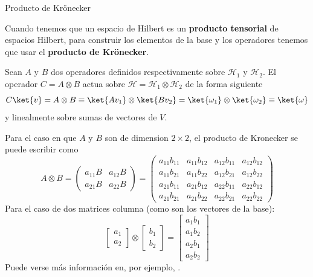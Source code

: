 \documentclass[a4paper,11pt]{book} %
\numberwithin{equation}{chapter}
\def\lp{\left(}
\def\rp{\right)}
\begin{document}
	\begin{mybox_blue}{Producto de Krönecker}
	
	Cuando tenemos que un espacio de Hilbert es un \textbf{producto tensorial} de espacios Hilbert, para construir los
	elementos de la base y los operadores tenemos que usar el \textbf{producto de Krönecker}. 
	
	Sean $A$ y $B$ dos operadores definidos respectivamente sobre $\mathcal{H}_1$ y $\mathcal{H}_2$. El operador 
	$C=A \otimes B$ actua sobre $\mathcal{H} = \mathcal{H}_1 \otimes \mathcal{H}_2$ de la forma siguiente
	\begin{equation} \label{ec_multiqubit_C=AxB_1}
	C \ket{v} = A \otimes B \equiv \ket{Av_1} \otimes \ket{Bv_2} = \ket{\omega_1} \otimes \ket{\omega_2} \equiv \ket{\omega}
	\end{equation}
	y linealmente sobre sumas de vectores de $V$. 
	
	Para el caso en que $A$ y $B$ son de dimension $2\times 2$, el producto de Kronecker se puede escribir como
	\begin{equation}
	A \otimes B = \lp \begin{matrix}
	a_{11} B & a_{12} B \\
	a_{21} B & a_{22} B
	\end{matrix}	 \rp = 
	\lp \begin{matrix}
	a_{11} b_{11} & a_{11} b_{12} & a_{12} b_{11} & a_{12}b_{12} \\
	a_{11} b_{21} & a_{11} b_{22} & a_{12} b_{21} & a_{12}b_{22} \\
	a_{21} b_{11} & a_{21} b_{12} & a_{22} b_{11} & a_{22}b_{12} \\
	a_{21} b_{21} & a_{21} b_{22} & a_{22} b_{21} & a_{22}b_{22} 
	\end{matrix} \rp
	\end{equation}
	Para el caso de dos matrices columna (como son los vectores de la base):
	\begin{equation}	
	\begin{bmatrix} a_1 \\ a_2 \end{bmatrix} \otimes \begin{bmatrix} b_1 \\ b_2 \end{bmatrix} = 
	\begin{bmatrix} a_1 b_1 \\ a_1 b_2 \\ a_2 b_1 \\ a_2 b_2	\end{bmatrix}
	\end{equation}
	Puede verse más información en, por ejemplo, \cite{wiki_kronecker}.
	\end{mybox_blue}
\end{document}
